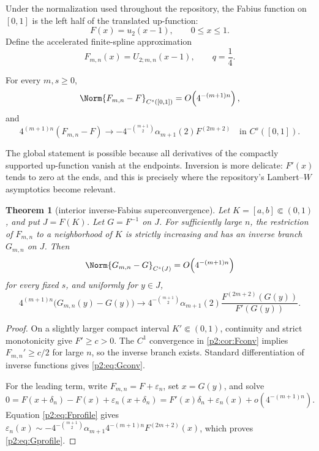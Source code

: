 \documentclass[11pt,oneside]{article}
\numberwithin{equation}{section}
\newtheorem{theorem}{Theorem}[section]
\theoremstyle{definition}
\theoremstyle{remark}
\begin{document}
Under the normalization used throughout the repository, the Fabius function on
\([0,1]\) is the left half of the translated up-function:
\begin{equation}
 F(x)=u_2(x-1),\qquad 0\leq x\leq1.
 \label{p2:eq:Fshift}
\end{equation}
Define the accelerated finite-spline approximation
\begin{equation}
 F_{m,n}(x)=U_{2;m,n}(x-1),\qquad q=\frac14.
 \label{p2:eq:Fapprox}
\end{equation}

\begin{corollary}
\label{p2:cor:Fconv}
For every \(m,s\geq0\),
\begin{equation}
 \Norm{F_{m,n}-F}_{C^s([0,1])}
 =O\!\left(4^{-(m+1)n}\right),
 \label{p2:eq:Fconv}
\end{equation}
and
\begin{equation}
 4^{(m+1)n}(F_{m,n}-F)
 \longrightarrow
 -4^{-\binom{m+1}{2}}\alpha_{m+1}(2)F^{(2m+2)}
 \quad\text{in }C^s([0,1]).
 \label{p2:eq:Fprofile}
\end{equation}
\end{corollary}

The global statement is possible because all derivatives of the compactly
supported up-function vanish at the endpoints. Inversion is more delicate:
\(F'(x)\) tends to zero at the ends, and this is precisely where the repository's
Lambert--\(W\) asymptotics become relevant.

\begin{theorem}[interior inverse-Fabius superconvergence]
\label{p2:thm:inverse}
Let \(K=[a,b]\Subset(0,1)\), and put \(J=F(K)\). Let \(G=F^{-1}\) on \(J\).
For sufficiently large \(n\), the restriction of \(F_{m,n}\) to a neighborhood
of \(K\) is strictly increasing and has an inverse branch \(G_{m,n}\) on \(J\).
Then
\begin{equation}
 \Norm{G_{m,n}-G}_{C^s(J)}
 =O\!\left(4^{-(m+1)n}\right)
 \label{p2:eq:Gconv}
\end{equation}
for every fixed \(s\), and uniformly for \(y\in J\),
\begin{equation}
 4^{(m+1)n}\bigl(G_{m,n}(y)-G(y)\bigr)
 \longrightarrow
 4^{-\binom{m+1}{2}}\alpha_{m+1}(2)
 \frac{F^{(2m+2)}(G(y))}{F'(G(y))}.
 \label{p2:eq:Gprofile}
\end{equation}
\end{theorem}

\begin{proof}
On a slightly larger compact interval \(K'\Subset(0,1)\), continuity and strict
monotonicity give \(F'\geq c>0\). The \(C^1\) convergence in
\cref{p2:cor:Fconv} implies \(F_{m,n}'\geq c/2\) for large \(n\), so the inverse
branch exists. Standard differentiation of inverse functions gives
\eqref{p2:eq:Gconv}.

For the leading term, write \(F_{m,n}=F+\varepsilon_n\), set \(x=G(y)\), and
solve
\[
 0=F(x+\delta_n)-F(x)+\varepsilon_n(x+\delta_n)
 =F'(x)\delta_n+\varepsilon_n(x)+o(4^{-(m+1)n}).
\]
Equation \eqref{p2:eq:Fprofile} gives
\(\varepsilon_n(x)\sim
 -4^{-\binom{m+1}{2}}\alpha_{m+1}4^{-(m+1)n}F^{(2m+2)}(x)\),
which proves \eqref{p2:eq:Gprofile}.
\end{proof}
\end{document}
